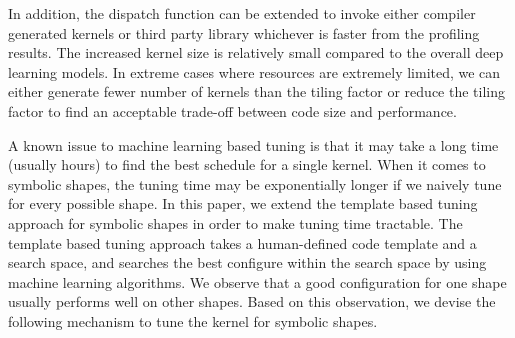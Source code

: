 



In addition, the dispatch function can be extended to invoke either compiler generated kernels
  or third party library whichever is faster from the profiling results.
The increased kernel size is relatively small compared to the overall deep learning models.
In extreme cases where resources are extremely limited,
  we can either generate fewer number of kernels than the tiling factor
  or reduce the tiling factor to find an acceptable trade-off
  between code size and performance.

A known issue to machine learning based tuning is that it may take a long time (usually hours) to find
  the best schedule for a single kernel.
When it comes to symbolic shapes, the tuning time may be exponentially longer if we
  naively tune for every possible shape.
In this paper, we extend the template based tuning approach for
  symbolic shapes in order to make tuning time tractable.
The template based tuning approach takes a human-defined
  code template and a search space, and searches the best configure
  within the search space by using machine learning algorithms.
We observe that a good configuration for one shape usually performs
  well on other shapes.
Based on this observation, we devise the following mechanism
  to tune the kernel for symbolic shapes.

